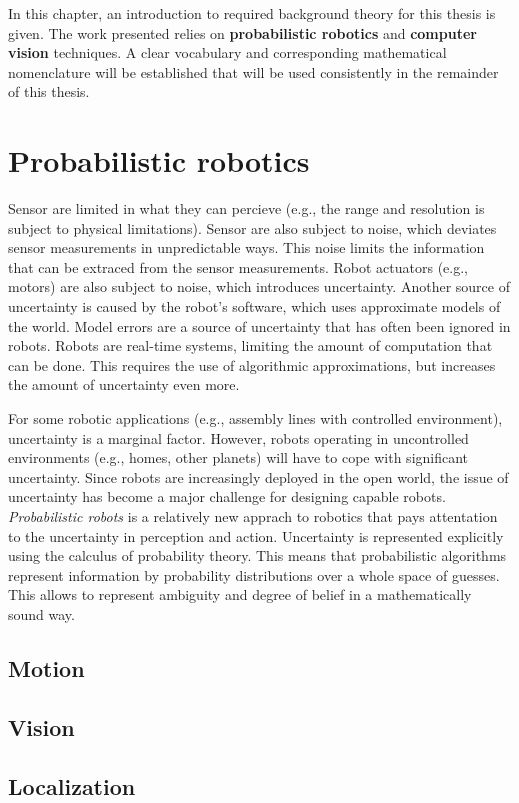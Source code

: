 In this chapter, an introduction to required background theory for this thesis is given.
The work presented relies on \textbf{probabilistic robotics} and \textbf{computer vision} techniques.
A clear vocabulary and corresponding mathematical nomenclature will be established that will be used consistently in the remainder of this thesis.

\section{Probabilistic robotics}
Sensor are limited in what they can percieve (e.g., the range and resolution is subject to physical limitations).
Sensor are also subject to noise, which deviates sensor measurements in unpredictable ways.
This noise limits the information that can be extraced from the sensor measurements.
Robot actuators (e.g., motors) are also subject to noise, which introduces uncertainty.
Another source of uncertainty is caused by the robot's software, which uses approximate models of the world.
Model errors are a source of uncertainty that has often been ignored in robots.
Robots are real-time systems, limiting the amount of computation that can be done.
This requires the use of algorithmic approximations, but increases the amount of uncertainty even more.

For some robotic applications (e.g., assembly lines with controlled environment), uncertainty is a marginal factor.
However, robots operating in uncontrolled environments (e.g., homes, other planets) will have to cope with significant uncertainty.
Since robots are increasingly deployed in the open world, the issue of uncertainty has become a major challenge for designing capable robots.
\textit{Probabilistic robots} is a relatively new apprach to robotics that pays attentation to the uncertainty in perception and action.
Uncertainty is represented explicitly using the calculus of probability theory.
This means that probabilistic algorithms represent information by probability distributions over a whole space of guesses.
This allows to represent ambiguity and degree of belief in a mathematically sound way.

		\subsection{Motion}
		\subsection{Vision}
		\subsection{Localization}
